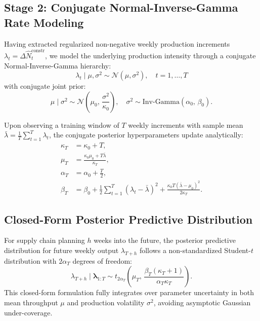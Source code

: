 \documentclass[11pt,a4paper]{article}
\begin{document}
\subsection{Stage 2: Conjugate Normal-Inverse-Gamma Rate Modeling}
Having extracted regularized non-negative weekly production increments $\lambda_t = \Delta \hat{N}_t^{\text{constr}}$, we model the underlying production intensity through a conjugate Normal-Inverse-Gamma hierarchy:
\begin{equation}
\lambda_t \mid \mu, \sigma^2 \sim \mathcal{N}(\mu, \sigma^2), \quad t = 1, \dots, T
\end{equation}
with conjugate joint prior:
\begin{equation}
\mu \mid \sigma^2 \sim \mathcal{N}\left(\mu_0, \, \frac{\sigma^2}{\kappa_0}\right), \quad \sigma^2 \sim \text{Inv-Gamma}(\alpha_0, \, \beta_0).
\end{equation}

Upon observing a training window of $T$ weekly increments with sample mean $\bar{\lambda} = \frac{1}{T}\sum_{t=1}^T \lambda_t$, the conjugate posterior hyperparameters update analytically:
\begin{align}
\kappa_T &= \kappa_0 + T, \\
\mu_T &= \frac{\kappa_0 \mu_0 + T \bar{\lambda}}{\kappa_T}, \\
\alpha_T &= \alpha_0 + \frac{T}{2}, \\
\beta_T &= \beta_0 + \frac{1}{2}\sum_{t=1}^T (\lambda_t - \bar{\lambda})^2 + \frac{\kappa_0 T (\bar{\lambda} - \mu_0)^2}{2 \kappa_T}.
\end{align}

\subsection{Closed-Form Posterior Predictive Distribution}
For supply chain planning $h$ weeks into the future, the posterior predictive distribution for future weekly output $\lambda_{T+h}$ follows a non-standardized Student-$t$ distribution with $2\alpha_T$ degrees of freedom:
\begin{equation}
\lambda_{T+h} \mid \boldsymbol{\lambda}_{1:T} \sim t_{2\alpha_T}\left( \mu_T, \, \frac{\beta_T (\kappa_T + 1)}{\alpha_T \kappa_T} \right).
\end{equation}
This closed-form formulation fully integrates over parameter uncertainty in both mean throughput $\mu$ and production volatility $\sigma^2$, avoiding asymptotic Gaussian under-coverage.
\end{document}
